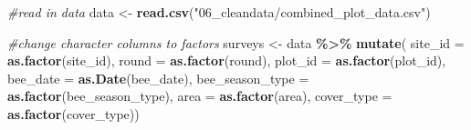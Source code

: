 \documentclass[
]{article}
\newenvironment{Shaded}{\begin{snugshade}}{\end{snugshade}}
\newcommand{\AttributeTok}[1]{\textcolor[rgb]{0.13,0.29,0.53}{#1}}
\newcommand{\CommentTok}[1]{\textcolor[rgb]{0.56,0.35,0.01}{\textit{#1}}}
\newcommand{\FunctionTok}[1]{\textcolor[rgb]{0.13,0.29,0.53}{\textbf{#1}}}
\newcommand{\NormalTok}[1]{#1}
\newcommand{\OtherTok}[1]{\textcolor[rgb]{0.56,0.35,0.01}{#1}}
\newcommand{\SpecialCharTok}[1]{\textcolor[rgb]{0.81,0.36,0.00}{\textbf{#1}}}
\newcommand{\StringTok}[1]{\textcolor[rgb]{0.31,0.60,0.02}{#1}}
\begin{document}
\begin{Shaded}
\begin{Highlighting}[]
\CommentTok{\#read in data}
\NormalTok{data }\OtherTok{\textless{}{-}} \FunctionTok{read.csv}\NormalTok{(}\StringTok{"06\_cleandata/combined\_plot\_data.csv"}\NormalTok{)}

\CommentTok{\#change character columns to factors}
\NormalTok{surveys }\OtherTok{\textless{}{-}}\NormalTok{ data }\SpecialCharTok{\%\textgreater{}\%}
   \FunctionTok{mutate}\NormalTok{(}
     \AttributeTok{site\_id =} \FunctionTok{as.factor}\NormalTok{(site\_id),}
     \AttributeTok{round =} \FunctionTok{as.factor}\NormalTok{(round),}
     \AttributeTok{plot\_id =} \FunctionTok{as.factor}\NormalTok{(plot\_id),}
     \AttributeTok{bee\_date =} \FunctionTok{as.Date}\NormalTok{(bee\_date),}
     \AttributeTok{bee\_season\_type =} \FunctionTok{as.factor}\NormalTok{(bee\_season\_type),}
     \AttributeTok{area =} \FunctionTok{as.factor}\NormalTok{(area),}
     \AttributeTok{cover\_type =} \FunctionTok{as.factor}\NormalTok{(cover\_type))}


\end{Highlighting}
\end{Shaded}
\end{document}

